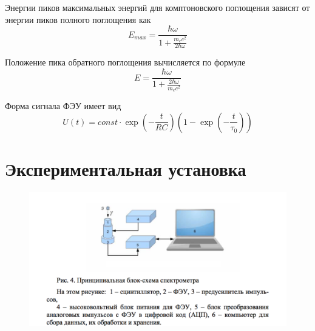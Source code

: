 \documentclass[a4paper,12pt]{article}
\begin{document}
		Энергии пиков максимальных энергий для комптоновского поглощения зависят от энергии пиков полного поглощения как
	\begin{equation}
		E_{max} = \frac{\hbar \omega}{1 + \frac{m_e c^2}{2 \hbar \omega}}
	\end{equation}
	
	Положение пика обратного поглощения вычисляется по формуле
	\begin{equation}
		E = \frac{\hbar \omega}{1 + \frac{2 \hbar \omega}{m_e c^2}}
	\end{equation}
	
	Форма сигнала ФЭУ имеет вид
	\begin{equation}
		U(t) = const \cdot \exp\left(-\frac{t}{RC}\right)\left(1 - \exp\left(-\frac{t}{\tau_0}\right)\right)
	\end{equation}
		
	\section{Экспериментальная установка}
	
	\begin{figure}[h!]
		\centering
	      \includegraphics[width=\linewidth]{555computer}
	\end{figure}
	
	
\end{document}
